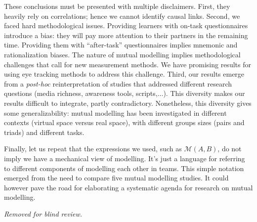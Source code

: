 \documentclass[natbib]{svjour3}
\newcommand{\gmodel}[2]{{$\mathcal{M}(#1, #2)$}}
\begin{document}
These conclusions must be presented with multiple disclaimers. First, they
heavily rely on correlations; hence we cannot identify causal links. Second, we
faced hard methodological issues. Providing learners with on-task questionnaires
introduce a bias: they will pay more attention to their partners in the
remaining time. Providing them with ``after-task'' questionnaires implies mnemonic
and rationalization biases. The nature of mutual modelling implies methodological
challenges that call for new  measurement methods. We have promising results for
using eye tracking methods to address this challenge. 
Third, our results emerge from a \emph{post-hoc} reinterpretation of studies
that addressed different research questions (media richness, awareness tools,
scripts,...). This diversity makes our results difficult to integrate, partly
contradictory. Nonetheless, this diversity gives some generalizability: mutual
modelling has been investigated in different contexts (virtual space versus real
space), with different groups sizes (pairs and triads) and different tasks.

Finally, let us repeat that the expressions we used, such as \gmodel{A}{B}, do
not imply we have a mechanical view of modelling. It's just a language for
referring to different components of modelling each other in teams.  This simple
notation emerged from the need to compare five mutual modelling studies. It
could however pave the road for elaborating a systematic agenda for research on
mutual modelling.

\begin{acknowledgements}


\textit{Removed for blind review.}

\end{acknowledgements}



\end{document}

